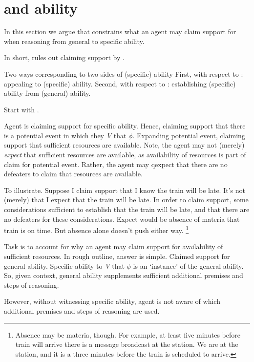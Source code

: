 \chapter{\ESU{} and ability}
\label{sec:first-conditional}

\begin{note}[Summary]
  In this section we argue that \ESU{} constrains what an agent may claim support for when reasoning from general to specific ability.

  In short, \ESU{} rules out claiming support by \adB{}.
\end{note}

\begin{note}
  Two ways corresponding to two sides of (specific) ability
  First, with respect to : appealing to (specific) ability.
  Second, with respect to \gsi{}: establishing (specific) ability from (general) ability.
\end{note}

\begin{note}
  Start with \gsi{}.

  Agent is claiming support for specific ability.
  Hence, claiming support that there is a potential event in which they \emph{V} that \(\phi\).
  Expanding potential event, claiming support that sufficient resources are available.
  Note, the agent may not (merely) \emph{expect} that sufficient resources are available, as availability of resources is part of claim for potential event.
  Rather, the agent may qexpect that there are no defeaters to claim that resources are available.

  To illustrate.
  Suppose I claim support that I know the train will be late.
  It's not (merely) that I expect that the train will be late.
  In order to claim support, some considerations sufficient to establish that the train will be late, and that there are no defeaters for these considerations.
  Expect would be absence of materia that train is on time.
  But absence alone doesn't push either way.\nolinebreak
  \footnote{
    Absence may be materia, though.
    For example, at least five minutes before train will arrive there is a message broadcast at the station.
    We are at the station, and it is a three minutes before the train is scheduled to arrive.
  }

  Task is to account for why an agent may claim support for availability of sufficient resources.
  In rough outline, answer is simple.
  Claimed support for general ability.
  Specific ability to \emph{V} that \(\phi\) is an `instance' of the general ability.
  So, given context, general ability supplements sufficient additional premises and steps of reasoning.

  However, without witnessing specific ability, agent is not aware of which additional premises and steps of reasoning are used.
\end{note}

